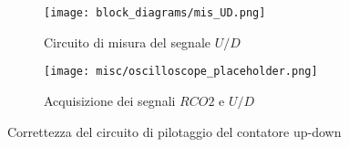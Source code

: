 \begin{figure}[H]
    \centering

    \begin{subfigure}{.5\textwidth}
        \centering
        \texttt{[image: block\_diagrams/mis\_UD.png]}
        \caption{Circuito di misura del segnale $U/D$}
        \label{mis_UD}
    \end{subfigure}%
    \begin{subfigure}{.5\textwidth}
        \centering
        \texttt{[image: misc/oscilloscope\_placeholder.png]}
        \caption{Acquisizione dei segnali $RCO2$ e $U/D$}
        \label{acq_UD}
    \end{subfigure}

    \caption{Correttezza del circuito di pilotaggio del contatore up-down}
    \label{UD}
\end{figure}

